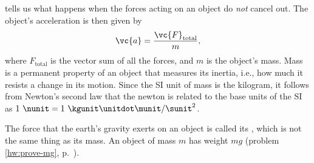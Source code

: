  tells us what happens when the forces acting
on an object do \emph{not} cancel out.
The object's acceleration is then given by
\begin{equation}
  \vc{a} = \frac{\vc{F}_\text{total}}{m},
\end{equation}
where $F_\text{total}$ is the vector sum of all the forces, and $m$ is the
object's mass. Mass is a permanent property of an object that measures
its inertia, i.e., how much it resists a change in its motion.
Since the SI unit of mass is the kilogram, it follows from Newton's
second law that the newton is related to the base units of the SI
as $1\ \nunit=1\ \kgunit\unitdot\munit/\sunit^2$.

The force that the earth's gravity exerts on an object is called its
, which is not the same thing as its mass.
An object of mass $m$ has weight $mg$ (problem \ref{hw:prove-mg}, p.~\pageref{hw:prove-mg}).
